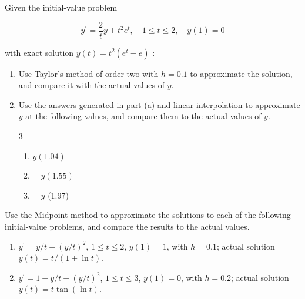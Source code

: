 \begin{posttest}%
\item Given the initial-value problem

$$
y^{\prime}=\frac{2}{t} y+t^{2} e^{t}, \quad 1 \leq t \leq 2, \quad y(1)=0
$$

with exact solution $y(t)=t^{2}\left(e^{t}-e\right)$ :
\begin{enumerate}[label=(\alph*)]
\item Use Taylor's method of order two with $h=0.1$ to approximate the solution, and compare it with the actual values of $y$.
\item Use the answers generated in part (a) and linear interpolation to approximate $y$ at the following values, and compare them to the actual values of $y$.
\begin{multicols}{3}
\begin{enumerate}[label=\roman*.]
\item $y(1.04)$
\item $\quad y(1.55)$
\item $\quad y$ (1.97)
\end{enumerate}
\end{multicols}
\end{enumerate}
\item Use the Midpoint method to approximate the solutions to each of the following initial-value problems, and compare the results to the actual values.
\begin{enumerate}[label=(\alph*)]
\item $y^{\prime}=y / t-(y / t)^{2}$, $1 \leq t \leq 2$, $y(1)=1$, with $h=0.1$; actual solution $y(t)=t /(1+\ln t)$.\\
\item $y^{\prime}=1+y / t+(y / t)^{2}$, $1 \leq t \leq 3$, $y(1)=0$, with $h=0.2$; actual solution $y(t)=t \tan (\ln t)$.
\end{enumerate}


\end{posttest}
